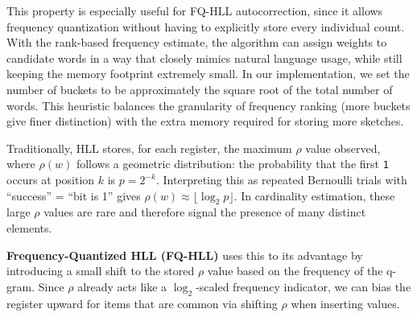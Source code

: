 \documentclass[12pt,a4paper]{article}
\begin{document}


This property is especially useful for FQ-HLL autocorrection, since it allows frequency quantization without having to explicitly store every individual count. With the rank-based frequency estimate, the algorithm can assign weights to candidate words in a way that closely mimics natural language usage, while still keeping the memory footprint extremely small. In our implementation, we set the number of buckets to be approximately the square root of the total number of words. This heuristic balances the granularity of frequency ranking (more buckets give finer distinction) with the extra memory required for storing more sketches. \newline

Traditionally, HLL stores, for each register, the maximum $\rho$ value observed, where $\rho(w)$ follows a geometric distribution: the probability that the first \texttt{1} occurs at position $k$ is $p = 2^{-k}$. Interpreting this as repeated Bernoulli trials with ``success'' = ``bit is 1'' gives $\rho(w) \approx \lfloor \log_2 p \rfloor$. In cardinality estimation, these large $\rho$ values are rare and therefore signal the presence of many distinct elements. \newline

\textbf{Frequency-Quantized HLL (FQ-HLL)} uses this to its advantage by introducing a small shift to the stored $\rho$ value based on the frequency of the q-gram. Since $\rho$ already acts like a $\log_2$-scaled frequency indicator, we can bias the register upward for items that are common via shifting $\rho$ when inserting values. \newline
\end{document}
